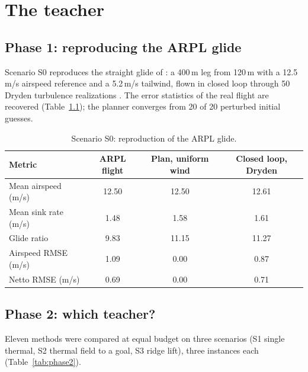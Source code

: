 \documentclass[11pt,a4paper,oneside]{report}
\begin{document}
\chapter{The teacher}\label{ch:teacher}

\section{Phase 1: reproducing the ARPL glide}
Scenario S0 reproduces the straight glide of \cite{morando2026}: a 400\,m leg from 120\,m with a 12.5\,m/s airspeed reference and a 5.2\,m/s tailwind, flown in closed loop through 50 Dryden turbulence realizations \cite{milf8785c}. The error statistics of the real flight are recovered (Table~\ref{tab:s0}); the planner converges from 20 of 20 perturbed initial guesses.

\begin{table}[ht]\centering\small
\caption{Scenario S0: reproduction of the ARPL glide.}\label{tab:s0}
\begin{tabular}{@{}lccc@{}}
\toprule
Metric & ARPL flight & Plan, uniform wind & Closed loop, Dryden \\ \midrule
Mean airspeed (m/s) & 12.50 & 12.50 & 12.61 \\
Mean sink rate (m/s) & 1.48 & 1.58 & 1.61 \\
Glide ratio & 9.83 & 11.15 & 11.27 \\
Airspeed RMSE (m/s) & 1.09 & 0.00 & 0.87 \\
Netto RMSE (m/s) & 0.69 & 0.00 & 0.71 \\
\bottomrule
\end{tabular}
\end{table}

\section{Phase 2: which teacher?}
Eleven methods were compared at equal budget on three scenarios (S1 single thermal, S2 thermal field to a goal, S3 ridge lift), three instances each (Table~\ref{tab:phase2}).
\end{document}
